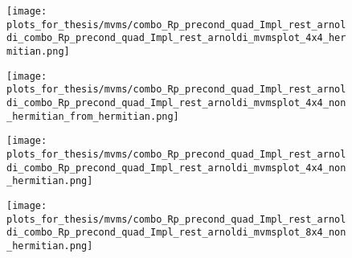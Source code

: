 \begin{figure}[H]
    \centering
    \begin{minipage}{0.45\textwidth}
        \centering
        \texttt{[image: plots\_for\_thesis/mvms/combo\_Rp\_precond\_quad\_Impl\_rest\_arnoldi\_combo\_Rp\_precond\_quad\_Impl\_rest\_arnoldi\_mvmsplot\_4x4\_hermitian.png]} %
    \end{minipage}%
    \hspace{0.02\textwidth} %
    \begin{minipage}{0.45\textwidth}
        \centering
        \texttt{[image: plots\_for\_thesis/mvms/combo\_Rp\_precond\_quad\_Impl\_rest\_arnoldi\_combo\_Rp\_precond\_quad\_Impl\_rest\_arnoldi\_mvmsplot\_4x4\_non\_hermitian\_from\_hermitian.png]} %
    \end{minipage}
    
    \vspace{0.02\textwidth} %
    
    \begin{minipage}{0.45\textwidth}
        \centering
        \texttt{[image: plots\_for\_thesis/mvms/combo\_Rp\_precond\_quad\_Impl\_rest\_arnoldi\_combo\_Rp\_precond\_quad\_Impl\_rest\_arnoldi\_mvmsplot\_4x4\_non\_hermitian.png]} %
    \end{minipage}%
    \hspace{0.02\textwidth} %
    \begin{minipage}{0.45\textwidth}
        \centering
        \texttt{[image: plots\_for\_thesis/mvms/combo\_Rp\_precond\_quad\_Impl\_rest\_arnoldi\_combo\_Rp\_precond\_quad\_Impl\_rest\_arnoldi\_mvmsplot\_8x4\_non\_hermitian.png]} %
    \end{minipage}
    

\end{figure}
